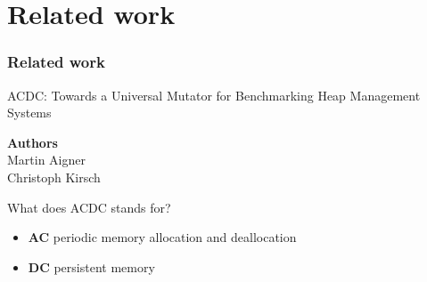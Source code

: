 %
%
\section{Related work}	
\begin{frame}
	\frametitle{Related work}
	ACDC: Towards a Universal Mutator for
	Benchmarking Heap Management Systems \\

	\bigskip

	\textbf{Authors} \\
	Martin Aigner \\ 
	Christoph Kirsch \\

	\bigskip

	What does ACDC stands for?
	\begin{itemize}
		\item \textbf{AC} periodic memory allocation and deallocation
		\item \textbf{DC} persistent memory
	\end{itemize}	
\end{frame}